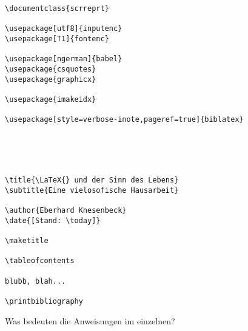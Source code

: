 \begin{lstlisting}
\documentclass{scrreprt}
 
\usepackage[utf8]{inputenc}
\usepackage[T1]{fontenc}

\usepackage[ngerman]{babel}
\usepackage{csquotes}
\usepackage{graphicx}

\usepackage{imakeidx}

\usepackage[style=verbose-inote,pageref=true]{biblatex}





\title{\LaTeX{} und der Sinn des Lebens}
\subtitle{Eine vielosofische Hausarbeit}

\author{Eberhard Knesenbeck}
\date{[Stand: \today]}

\maketitle

\tableofcontents

blubb, blah...

\printbibliography

\end{lstlisting}

Was bedeuten die Anweisungen im einzelnen?

